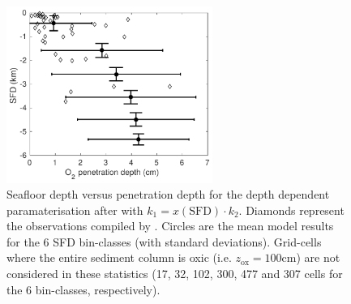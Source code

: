 \documentclass[gmd, manuscript]{copernicus}
\begin{document}
\begin{figure}[htbp]
\begin{center}
	\includegraphics[width=0.6\textwidth]{figures/OMEN-GENIE-Exp/2908_34_Boudreau_depthdep_zox_vs_SFD.pdf}
	\caption{Seafloor depth versus  penetration depth for the depth dependent paramaterisation after \citet{boudreau1997diagenetic} with $k_1 = x(\mathrm{SFD}) \cdot k_2$. 
	Diamonds represent the observations compiled by \citet{meile_global_2003}. 
	Circles are the mean model results for the 6 SFD bin-classes (with standard deviations). 
	Grid-cells where the entire sediment column is oxic (i.e. $z_{\mathrm{ox}} = 100$cm) are not considered in these statistics 
	(17, 32, 102, 300, 477 and 307 cells for the 6 bin-classes, respectively). 
	}\label{fig:OMEN_GENIE_Boudreau_depthdep_zox_vs_SFD}
\end{center}
\end{figure}

% 
% 



\end{document}
